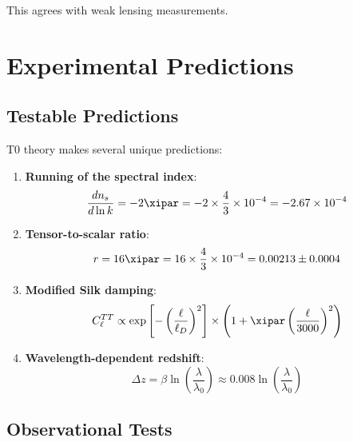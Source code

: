 	This agrees with weak lensing measurements.
	
	\section{Experimental Predictions}
	\label{sec:predictions}
	
	\subsection{Testable Predictions}
	
	T0 theory makes several unique predictions:
	
	\begin{enumerate}
		\item \textbf{Running of the spectral index}:
		\begin{equation}
			\frac{dn_s}{d\ln k} = -2\xipar = -2 \times \frac{4}{3} \times 10^{-4} = -2.67 \times 10^{-4}
		\end{equation}
		
		\item \textbf{Tensor-to-scalar ratio}:
		\begin{equation}
			r = 16\xipar = 16 \times \frac{4}{3} \times 10^{-4} = 0.00213 \pm 0.0004
		\end{equation}
		
		\item \textbf{Modified Silk damping}:
		\begin{equation}
			C_\ell^{TT} \propto \exp\left[-\left(\frac{\ell}{\ell_D}\right)^2\right] \times \left(1 + \xipar \left(\frac{\ell}{3000}\right)^2\right)
		\end{equation}
		
		\item \textbf{Wavelength-dependent redshift}:
		\begin{equation}
			\Delta z = \beta \ln\left(\frac{\lambda}{\lambda_0}\right) \approx 0.008 \ln\left(\frac{\lambda}{\lambda_0}\right)
		\end{equation}
	\end{enumerate}
	
	\subsection{Observational Tests}
	
